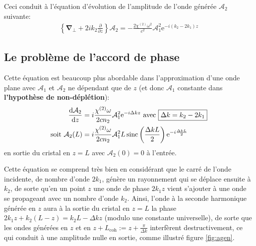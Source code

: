 \documentclass[11pt,a4paper] { article}
\newcommand{\A}{\mathcal{A}}
\newcommand{\e}[1]{\text{e}^{#1}}
\newcommand{\mathsc}[1]{\mathrm{\scriptscriptstyle {#1}}}
\renewcommand{\v}[1]{\boldsymbol{\mathbf{#1}}}
\begin{document}
Ceci conduit à l'équation d'évolution de l'amplitude de l'onde générée $\A_2$ suivante:
\begin{align}
	\left\{\v\nabla_\bot + 2 i k_2 \frac{\partial}{\partial z} \right\} \A_2 = - \frac{2 \chi^{(2)} \omega^2}{c^2} \A_1^2 \e{- i (k_2 - 2k_1) z}
	\label{eq:SHG}
\end{align}

\subsection{Le problème de l'accord de phase}
\label{qpm}
Cette équation est beaucoup plus abordable dans l'approximation d'une onde plane avec $\A_1$ et $\A_2$ ne dépendant que de $z$ (et donc $\A_1$ constante dans \textbf{l'hypothèse de non-déplétion}):
\begin{align}
	\dv{\A_2}{z} &= i\frac{\chi^{(2)}\omega}{2cn_2} \A_1^2 \e{-i \Delta k z} \text{ avec } \boxed{\Delta k = k_2 - 2k_1} \label{eq:pwe} \\
	\text{soit } \A_2(L) &= i \frac{\chi^{(2)}\omega}{2 cn_2} \A_1^2 L \operatorname{sinc}\left( \frac{\Delta k L}{2} \right) \e{-i\frac{\Delta k L}{2}}
\end{align}
en sortie du cristal en $z=L$ avec $\A_2(0)=0$ à l'entrée.

Cette équation se comprend très bien en considérant que le carré de l'onde incidente, de nombre d'onde $2k_1$, génère un rayonnement qui se déplace ensuite à $k_2$, de sorte qu'en un point $z$ une onde de phase $2k_1z$ vient s'ajouter à une onde se propageant avec un nombre d'onde $k_2$. Ainsi, l'onde à la seconde harmonique générée en $z$ aura à la sortie du cristal en $z=L$ la phase $2k_1 z + k_2 (L-z) = k_2 L - \Delta k z$ (modulo une constante universelle), de sorte que les ondes générées en $z$ et en $z+L_\mathsc{coh} := z + \frac{\pi}{\Delta k}$ interfèrent destructivement, ce qui conduit à une amplitude nulle en sortie, comme illustré figure \ref{fig:agen}.
\end{document}
